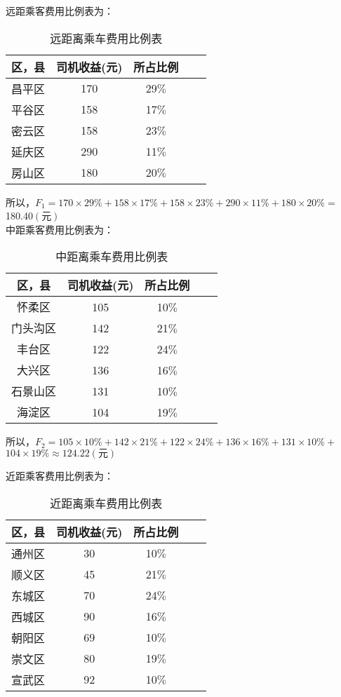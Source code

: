 \documentclass[withoutpreface,bwprint]{cumcmthesis} %
\begin{document}
远距乘客费用比例表为：
\begin{table}[!htbp]
	\caption{远距离乘车费用比例表}\label{tab:001} \centering
	\begin{tabular}{ccccc}
		\toprule[2pt]
		区，县 & 司机收益(元) & 所占比例\\
		\midrule[1pt]
		昌平区 & 170 & 29$\%$\\
		平谷区 & 158 & 17$\%$\\
		密云区 & 158 & 23$\%$\\
		延庆区 & 290 & 11$\%$\\
		房山区 & 180 & 20$\%$\\
		\bottomrule[1.5pt]
	\end{tabular}
\end{table}

所以，$F_{1}=170 \times 29 \%+158 \times 17 \%+158 \times 23 \%+290 \times 11 \%+180 \times 20 \%=$
180.40$({\text{元}})$\\

中距乘客费用比例表为：

\begin{table}[!htbp]
	\caption{中距离乘车费用比例表}\label{tab:001} \centering
	\begin{tabular}{ccccc}
		\toprule[2pt]
		区，县 & 司机收益(元) & 所占比例\\
		\midrule[1pt]
		怀柔区 & 105 & 10$\%$\\
		门头沟区 & 142 & 21$\%$\\
		丰台区 & 122 & 24$\%$\\
		大兴区 & 136 & 16$\%$\\
		石景山区 & 131 & 10$\%$\\
		海淀区 & 104 & 19$\%$\\
		\bottomrule[1.5pt]
	\end{tabular}
\end{table}
\newpage
所以，$F_{2}=105 \times 10 \%+142 \times 21 \%+122 \times 24 \%+136 \times 16 \%+131 \times 10 \%+$
$104 \times 19 \% \approx 124.22({\text{元}})$

近距乘客费用比例表为：

\begin{table}[!htbp]
	\caption{近距离乘车费用比例表}\label{tab:001} \centering
	\begin{tabular}{ccccc}
		\toprule[2pt]
		区，县 & 司机收益(元) & 所占比例\\
		\midrule[1pt]
		通州区 & 30 & 10$\%$\\
		顺义区 & 45 & 21$\%$\\
		东城区 & 70 & 24$\%$\\
		西城区 & 90 & 16$\%$\\
		朝阳区 & 69 & 10$\%$\\
		崇文区 & 80 & 19$\%$\\
		宣武区 & 92 & 10$\%$\\
		\bottomrule[1.5pt]
	\end{tabular}
\end{table}
\end{document}
